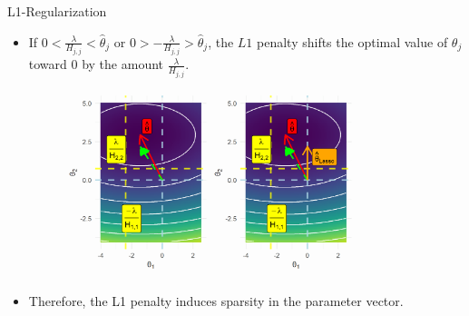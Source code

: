 \documentclass[11pt,compress,t,notes=noshow, xcolor=table]{beamer}
\begin{document}
\begin{vbframe} {L1-Regularization}
\begin{itemize}
  \end{itemize}
\framebreak
  \begin{itemize}
  
    \item If $0 < \frac{\lambda}{H_{j,j}} < \hat{\theta}_j$ or  $0 > -\frac{\lambda}{H_{j,j}} > \hat{\theta}_j$, the $L1$ penalty shifts the optimal value of $\theta_j$ toward 0 by the amount $\frac{\lambda}{H_{j,j}}$.

\vfill


\begin{figure}
\includegraphics[width=0.8\textwidth]{figure/l1_reg_hess_02.png}\\
\end{figure}

    \item Therefore, the L1 penalty induces sparsity in the parameter vector.
  \end{itemize}

  
\end{vbframe}

\endlecture
\end{document}
